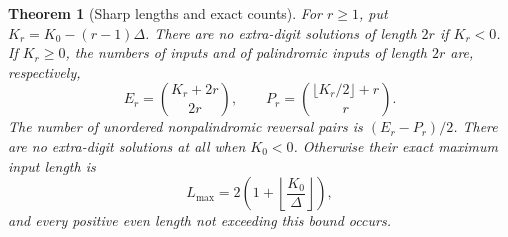 \documentclass[11pt]{amsart}
\newtheorem{theorem}{Theorem}[section]
\theoremstyle{remark}\newtheorem{remark}[theorem]{Remark}
\begin{document}
\begin{theorem}[Sharp lengths and exact counts]\label{nc:thm:counts}
For $r\ge1$, put $K_r=K_0-(r-1)\Delta$. There are no extra-digit solutions of length $2r$ if $K_r<0$. If $K_r\ge0$, the numbers of inputs and of palindromic inputs of length $2r$ are, respectively,
\begin{equation}\label{nc:eq:counts}
 E_r=\binom{K_r+2r}{2r},\qquad
 P_r=\binom{\lfloor K_r/2\rfloor+r}{r}.
\end{equation}
The number of unordered nonpalindromic reversal pairs is $(E_r-P_r)/2$.
There are no extra-digit solutions at all when $K_0<0$. Otherwise their exact maximum input length is
\begin{equation}\label{nc:eq:maxlength}
 L_{\max}=2\left(1+\left\lfloor\frac{K_0}{\Delta}\right\rfloor\right),
\end{equation}
and every positive even length not exceeding this bound occurs.
\end{theorem}
\end{document}
